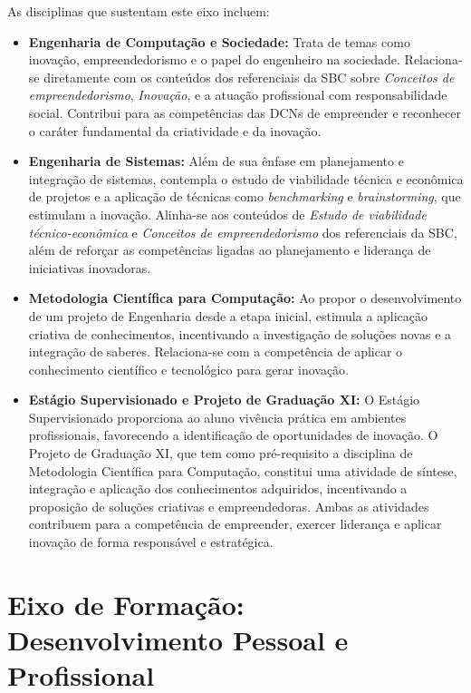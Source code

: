 As disciplinas que sustentam este eixo incluem:

\begin{itemize}
  \item \textbf{Engenharia de Computação e Sociedade:} Trata de temas como inovação, empreendedorismo e o papel do engenheiro na sociedade. Relaciona-se diretamente com os conteúdos dos referenciais da SBC sobre \textit{Conceitos de empreendedorismo}, \textit{Inovação}, e a atuação profissional com responsabilidade social. Contribui para as competências das DCNs de empreender e reconhecer o caráter fundamental da criatividade e da inovação.

  \item \textbf{Engenharia de Sistemas:} Além de sua ênfase em planejamento e integração de sistemas, contempla o estudo de viabilidade técnica e econômica de projetos e a aplicação de técnicas como \textit{benchmarking} e \textit{brainstorming}, que estimulam a inovação. Alinha-se aos conteúdos de \textit{Estudo de viabilidade técnico-econômica} e \textit{Conceitos de empreendedorismo} dos referenciais da SBC, além de reforçar as competências ligadas ao planejamento e liderança de iniciativas inovadoras.

  \item \textbf{Metodologia Científica para Computação:} Ao propor o desenvolvimento de um projeto de Engenharia desde a etapa inicial, estimula a aplicação criativa de conhecimentos, incentivando a investigação de soluções novas e a integração de saberes. Relaciona-se com a competência de aplicar o conhecimento científico e tecnológico para gerar inovação.

  \item \textbf{Estágio Supervisionado e Projeto de Graduação XI:} O Estágio Supervisionado proporciona ao aluno vivência prática em ambientes profissionais, favorecendo a identificação de oportunidades de inovação. O Projeto de Graduação XI, que tem como pré-requisito a disciplina de Metodologia Científica para Computação, constitui uma atividade de síntese, integração e aplicação dos conhecimentos adquiridos, incentivando a proposição de soluções criativas e empreendedoras. Ambas as atividades contribuem para a competência de empreender, exercer liderança e aplicar inovação de forma responsável e estratégica.
\end{itemize}

\section*{Eixo de Formação: Desenvolvimento Pessoal e Profissional}

